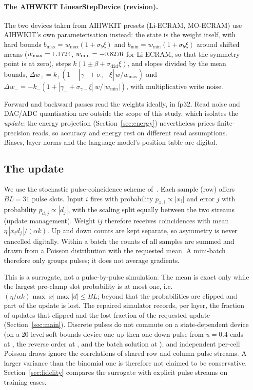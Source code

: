 \paragraph{The AIHWKIT LinearStepDevice (revision).} The two devices taken from AIHWKIT presets (Li-ECRAM, MO-ECRAM) use
AIHWKIT's own parameterisation instead: the state is the weight itself, with hard bounds $b_{\max}=w_{\max}(1+\sigma_b\xi)$ and
$b_{\min}=w_{\min}(1+\sigma_b\xi)$ around shifted means ($w_{\max}=1.1724$, $w_{\min}=-0.8276$ for Li-ECRAM, so that the
symmetry point is at zero), steps $k(1\pm\beta+\sigma_{\mathrm{d2d}}\xi)$, and slopes divided by the mean bounds,
$\Delta w_+=k_+(1-|\gamma_++\sigma_{\gamma+}\xi|\,w/w_{\max})$ and $\Delta w_-=-k_-(1+|\gamma_-+\sigma_{\gamma-}\xi|\,w/|w_{\min}|)$,
with multiplicative write noise.

Forward and backward passes read the weights ideally, in fp32. Read noise and DAC/ADC quantisation are outside the scope of this
study, which isolates the \emph{update}; the energy projection (Section~\ref{sec:energy}) nevertheless prices finite-precision
reads, so accuracy and energy rest on different read assumptions. Biases, layer norms and the language model's position
table are digital.

\subsection{The update}\label{sec:update}
We use the stochastic pulse-coincidence scheme of~\cite{gokmen2016}. Each sample (row) offers $BL=31$ pulse slots. Input $i$
fires with probability $p_{x,i}\propto|x_i|$ and error $j$ with probability $p_{d,j}\propto|d_j|$, with the scaling split equally
between the two streams (update management). Weight $ij$ therefore receives coincidences with mean
$\eta\,|x_i d_j|/(\alpha k)$. Up and down counts are kept separate, so asymmetry is never cancelled digitally. Within a batch the
counts of all samples are summed and drawn from a Poisson distribution with the requested mean. A mini-batch therefore only
groups pulses; it does not average gradients.

This is a surrogate, not a pulse-by-pulse simulation. The mean is exact only while the largest pre-clamp slot probability is at
most one, i.e.\ $(\eta/\alpha k)\max|x|\max|d|\le BL$; beyond that the probabilities are clipped and part of the update is lost.
The repaired simulator records, per layer, the fraction of updates that clipped and the lost fraction of the requested update
(Section~\ref{sec:main}). Discrete pulses do not commute on a state-dependent device (on a 20-level soft-bounds device one up
then one down pulse from $u=0.4$ ends at \RVorderUpDn, the reverse order at \RVorderDnUp, and the batch solution at \RVorderBatch), and independent
per-cell Poisson draws ignore the correlations of shared row and column pulse streams. A larger variance than the binomial one
is therefore not claimed to be conservative. Section~\ref{sec:fidelity} compares the surrogate with explicit pulse streams on
training cases.

